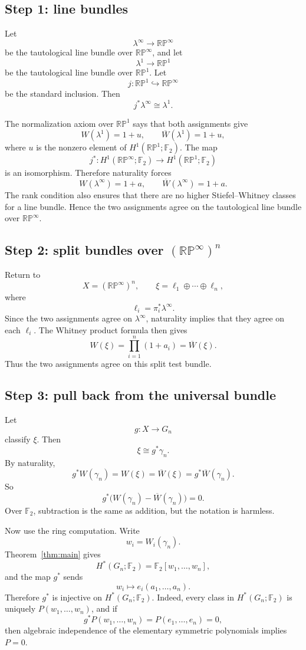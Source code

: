 \documentclass[11pt]{article}
\theoremstyle{remark}
\newcommand{\F}{\mathbb F}
\newcommand{\RP}{\mathbb{RP}}
\newcommand{\Gn}{G_n}
\newcommand{\gamman}{\gamma_n}
\newcommand{\lambdainf}{\lambda^\infty}
\newcommand{\lambdaone}{\lambda^1}
\newcommand{\olW}{\overline{W}}
\begin{document}
\subsection{Step 1: line bundles}

Let
\[
  \lambdainf\to \RP^\infty
\]
be the tautological line bundle over $\RP^\infty$, and let
\[
  \lambdaone\to \RP^1
\]
be the tautological line bundle over $\RP^1$.  Let
\[
  j:\RP^1\hookrightarrow \RP^\infty
\]
be the standard inclusion.  Then
\[
  j^*\lambdainf\cong \lambdaone.
\]

The normalization axiom over $\RP^1$ says that both assignments give
\[
  W(\lambdaone)=1+u,
  \qquad
  \olW(\lambdaone)=1+u,
\]
where $u$ is the nonzero element of $H^1(\RP^1;\F_2)$.  The map
\[
  j^*:H^1(\RP^\infty;\F_2)\to H^1(\RP^1;\F_2)
\]
is an isomorphism.  Therefore naturality forces
\[
  W(\lambdainf)=1+a,
  \qquad
  \olW(\lambdainf)=1+a.
\]
The rank condition also ensures that there are no higher Stiefel--Whitney classes for a line bundle.  Hence the two assignments agree on the tautological line bundle over $\RP^\infty$.

\subsection{Step 2: split bundles over $(\RP^\infty)^n$}

Return to
\[
  X=(\RP^\infty)^n,
  \qquad
  \xi=\ell_1\oplus\cdots\oplus\ell_n,
\]
where
\[
  \ell_i=\pi_i^*\lambdainf.
\]
Since the two assignments agree on $\lambdainf$, naturality implies that they agree on each $\ell_i$.  The Whitney product formula then gives
\[
  W(\xi)=\prod_{i=1}^n(1+a_i)=\olW(\xi).
\]
Thus the two assignments agree on this split test bundle.

\subsection{Step 3: pull back from the universal bundle}

Let
\[
  g:X\to \Gn
\]
classify $\xi$.  Then
\[
  \xi\cong g^*\gamman.
\]
By naturality,
\[
  g^*W(\gamman)=W(\xi)=\olW(\xi)=g^*\olW(\gamman).
\]
So
\[
  g^*\bigl(W(\gamman)-\olW(\gamman)\bigr)=0.
\]
Over $\F_2$, subtraction is the same as addition, but the notation is harmless.

Now use the ring computation.  Write
\[
  w_i=W_i(\gamman).
\]
Theorem~\ref{thm:main} gives
\[
  H^*(\Gn;\F_2)=\F_2[w_1,\dots,w_n],
\]
and the map $g^*$ sends
\[
  w_i\longmapsto e_i(a_1,\dots,a_n).
\]
Therefore $g^*$ is injective on $H^*(\Gn;\F_2)$.  Indeed, every class in $H^*(\Gn;\F_2)$ is uniquely $P(w_1,\dots,w_n)$, and if
\[
  g^*P(w_1,\dots,w_n)=P(e_1,\dots,e_n)=0,
\]
then algebraic independence of the elementary symmetric polynomials implies $P=0$.
\end{document}
